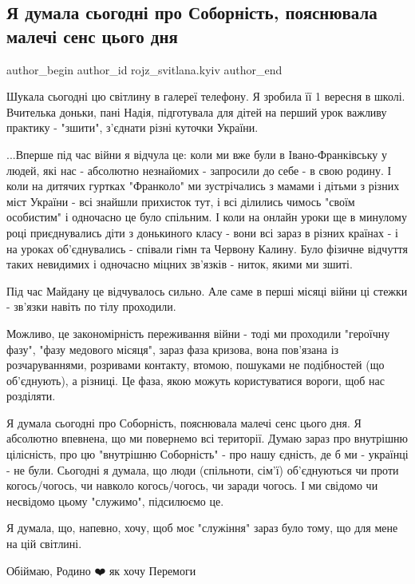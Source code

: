  
 
 
 
 

\subsection{Я думала сьогодні про Соборність, пояснювала малечі сенс цього дня}
\label{sec:22_01_2023.fb.rojz_svitlana.kyiv.1.ya_dumala_sogodn__pr}

\ifcmt
 author_begin
   author_id rojz_svitlana.kyiv
 author_end
\fi

Шукала сьогодні цю світлину в галереї телефону. Я зробила її 1 вересня в школі.
Вчителька доньки, пані Надія, підготувала для дітей на перший урок важливу
практику - "зшити", з'єднати різні куточки України. 

...Вперше під час війни я відчула це: коли ми вже були в Івано-Франківську у
людей, які нас - абсолютно незнайомих - запросили до себе - в свою родину. І
коли на дитячих гуртках "Франколо" ми зустрічались з мамами і дітьми з різних
міст України - всі знайшли прихисток тут, і всі ділились чимось "своїм
особистим" і одночасно це було спільним. І коли на онлайн уроки ще в минулому
році приєднувались діти з донькиного класу - вони всі зараз в різних країнах -
і на уроках об'єднувались - співали гімн та Червону Калину. Було фізичне
відчуття таких невидимих і одночасно міцних зв'язків - ниток, якими ми зшиті. 

Під час Майдану це відчувалось сильно. Але саме в перші місяці війни ці стежки
- зв'язки навіть по тілу проходили. 

Можливо, це закономірність переживання війни - тоді ми проходили "героїчну
фазу", "фазу медового місяця", зараз фаза кризова, вона пов'язана із
розчаруваннями, розривами контакту, втомою, пошуками не подібностей (що
об'єднують), а різниці. Це фаза, якою можуть користуватися вороги, щоб нас
розділяти. 

Я думала сьогодні про Соборність, пояснювала малечі сенс цього дня. Я абсолютно
впевнена, що ми повернемо всі території. Думаю зараз про внутрішню цілісність,
про цю "внутрішню Соборність" - про нашу єдність, де б ми - українці -  не
були. Сьогодні я думала, що люди (спільноти, сім'ї) об'єднуються чи проти
когось/чогось, чи навколо когось/чогось, чи заради чогось. І ми свідомо чи
несвідомо цьому "служимо", підсилюємо це. 

Я думала, що, напевно, хочу, щоб моє "служіння" зараз було тому, що для мене на
цій світлині. 

Обіймаю, Родино ❤️ як хочу Перемоги
